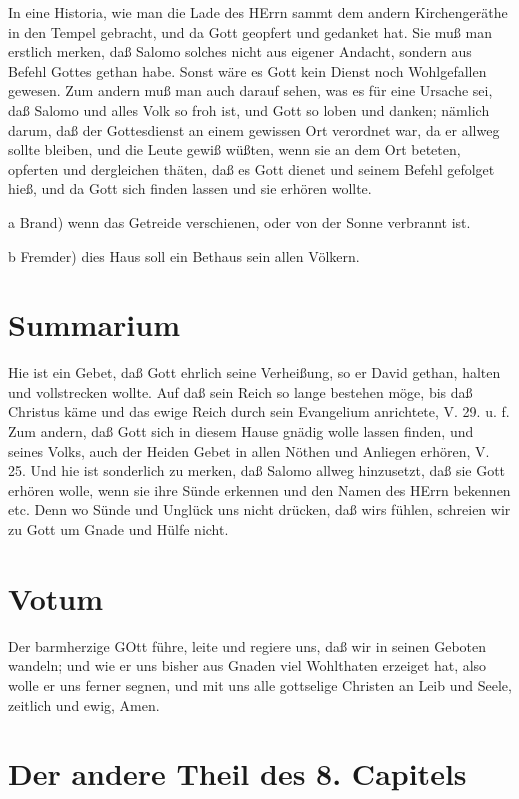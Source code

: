 In eine Historia, wie man die Lade des HErrn sammt dem andern Kirchengeräthe in den Tempel gebracht, und da Gott geopfert und gedanket hat. Sie muß man erstlich merken, daß Salomo
solches nicht aus eigener Andacht, sondern aus Befehl Gottes gethan habe. Sonst wäre es Gott kein Dienst noch Wohlgefallen gewesen. Zum andern muß man auch darauf sehen, was es für eine Ursache sei, daß Salomo und alles Volk so froh ist, und Gott so loben und danken; nämlich darum, daß der Gottesdienst an einem gewissen Ort verordnet war, da er allweg sollte bleiben, und die Leute gewiß wüßten, wenn sie an dem Ort beteten, opferten und dergleichen thäten, daß es Gott dienet und seinem Befehl gefolget hieß, und da Gott sich finden lassen und sie erhören wollte.

a Brand) wenn das Getreide verschienen, oder von der Sonne verbrannt ist.

b Fremder) dies Haus soll ein Bethaus sein allen Völkern.

\section{Summarium}

Hie ist ein Gebet, daß Gott ehrlich seine Verheißung, so er David gethan, halten und vollstrecken wollte. Auf daß sein Reich so lange bestehen möge, bis daß Christus käme und das ewige Reich durch sein Evangelium anrichtete, V. 29. u. f. Zum andern, daß Gott sich in diesem Hause gnädig wolle lassen finden, und seines Volks, auch der Heiden Gebet in allen Nöthen und Anliegen erhören, V. 25. Und hie ist sonderlich zu merken, daß Salomo allweg hinzusetzt, daß sie Gott erhören wolle, wenn sie ihre Sünde erkennen und den Namen des HErrn bekennen etc. Denn wo Sünde und Unglück uns nicht drücken, daß wirs fühlen, schreien wir zu Gott um Gnade und Hülfe nicht.

\section{Votum}

Der barmherzige GOtt führe, leite und regiere uns, daß wir in seinen Geboten wandeln; und wie er uns bisher aus Gnaden viel Wohlthaten erzeiget hat, also wolle er uns ferner segnen, und mit uns alle gottselige Christen an Leib und Seele, zeitlich und ewig, Amen.

\section{Der andere Theil des 8. Capitels}

